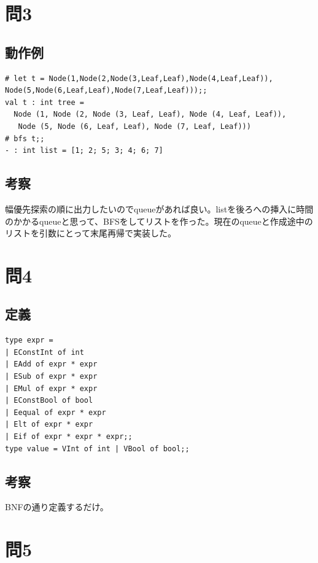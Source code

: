\documentclass[11pt,a4paper]{jsarticle}
\begin{document}
\section*{問3}
\subsection*{動作例}
\begin{lstlisting}[basicstyle=\ttfamily\footnotesize, frame=single]
# let t = Node(1,Node(2,Node(3,Leaf,Leaf),Node(4,Leaf,Leaf)),
Node(5,Node(6,Leaf,Leaf),Node(7,Leaf,Leaf)));;
val t : int tree =
  Node (1, Node (2, Node (3, Leaf, Leaf), Node (4, Leaf, Leaf)),
   Node (5, Node (6, Leaf, Leaf), Node (7, Leaf, Leaf)))
# bfs t;;
- : int list = [1; 2; 5; 3; 4; 6; 7]
\end{lstlisting}
\subsection*{考察}
幅優先探索の順に出力したいのでqueueがあれば良い。listを後ろへの挿入に時間のかかるqueueと思って、BFSをしてリストを作った。現在のqueueと作成途中のリストを引数にとって末尾再帰で実装した。
\section*{問4}
\subsection*{定義}
\begin{lstlisting}[basicstyle=\ttfamily\footnotesize, frame=single]
type expr =
| EConstInt of int
| EAdd of expr * expr
| ESub of expr * expr
| EMul of expr * expr
| EConstBool of bool
| Eequal of expr * expr
| Elt of expr * expr
| Eif of expr * expr * expr;;
type value = VInt of int | VBool of bool;;
\end{lstlisting}
\subsection*{考察}
BNFの通り定義するだけ。
\section*{問5}
\end{document}
